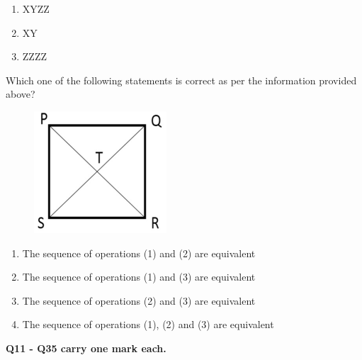 \documentclass[12pt,a4paper]{article}
\begin{document}
\begin{enumerate}
         \begin{enumerate}
            \item XYZZ
            \item XY
            \item ZZZZ
         \end{enumerate}

         Which one of the following statements is correct as per the information provided above?

         \begin{figure}[H]
            \centering
            \includegraphics[scale=0.5]{q10}
            \label{fig:q10}
         \end{figure}
         \begin{enumerate}
            \item The sequence of operations (1) and (2) are equivalent
            \item The sequence of operations (1) and (3) are equivalent
            \item The sequence of operations (2) and (3) are equivalent
            \item The sequence of operations (1), (2) and (3) are equivalent
         \end{enumerate}
\end{enumerate}

\normalsize\textbf{Q11 - Q35 carry one mark each.}
\end{document}

